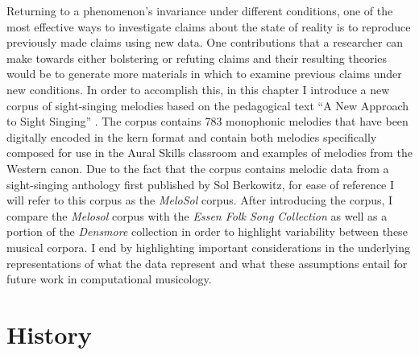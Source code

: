 \documentclass[]{book}
\begin{document}
Returning to a phenomenon's invariance under different conditions, one of the most effective ways to investigate claims about the state of reality is to reproduce previously made claims using new data.
One contributions that a researcher can make towards either bolstering or refuting claims and their resulting theories would be to generate more materials in which to examine previous claims under new conditions.
In order to accomplish this, in this chapter I introduce a new corpus of sight-singing melodies based on the pedagogical text ``A New Approach to Sight Singing'' \citep{berkowitzNewApproachSight2011}.
The corpus contains 783 monophonic melodies that have been digitally encoded in the kern format \citep{huronHumdrumToolkitReference1994} and contain both melodies specifically composed for use in the Aural Skills classroom and examples of melodies from the Western canon.
Due to the fact that the corpus contains melodic data from a sight-singing anthology first published by Sol Berkowitz, for ease of reference I will refer to this corpus as the \emph{MeloSol} corpus.
After introducing the corpus, I compare the \emph{Melosol} corpus with the \emph{Essen Folk Song Collection} \citep{schaffrathEssenFolkSong1995} as well as a portion of the \emph{Densmore} collection \citep{shanahanDENSMORECOLLECTIONNATIVE2014} in order to highlight variability between these musical corpora.
I end by highlighting important considerations in the underlying representations of what the data represent and what these assumptions entail for future work in computational musicology.

\hypertarget{history}{%
\section{History}\label{history}}
\end{document}
